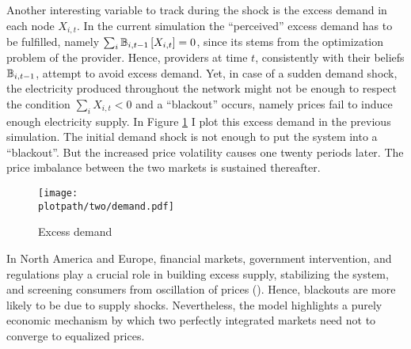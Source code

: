 Another interesting variable to track during the shock is the excess demand in each node $X_{i, t}$. In the current simulation the ``perceived'' excess demand has to be fulfilled, namely $\sum_i \mathbb{B}_{i, t-1}\left[X_{i, t}\right] = 0$, since its stems from the optimization problem of the provider. Hence, providers at time $t$, consistently with their beliefs $\mathbb{B}_{i, t-1}$, attempt to avoid excess demand. Yet, in case of a sudden demand shock, the electricity produced throughout the network might not be enough to respect the condition $\sum_i X_{i, t} < 0$ and a ``blackout'' occurs, namely prices fail to induce enough electricity supply.  In Figure \ref{fig:twodemand} I plot this excess demand in the previous simulation. The initial demand shock is not enough to put the system into a ``blackout''. But the increased price volatility causes one twenty periods later. The price imbalance between the two markets is sustained thereafter.

\begin{figure}[H]
  \centering
  \texttt{[image: \\plotpath/two/demand.pdf]}
  \caption{Excess demand} \label{fig:twodemand}
\end{figure}

In North America and Europe, financial markets, government intervention, and regulations play a crucial role in building excess supply, stabilizing the system, and screening consumers from oscillation of prices (\cite{Cicala2017, Mulder2019}). Hence, blackouts are more likely to be due to supply shocks. Nevertheless, the model highlights a purely economic mechanism by which two perfectly integrated markets need not to converge to equalized prices. %